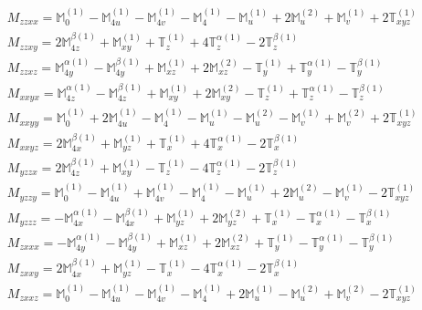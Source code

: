 \documentclass[fleqn,8pt,landscape]{jsarticle}
\begin{document}
\begin{align*}
& M_{zzxx} = \mathbb{M}_{0}^{(1)} - \mathbb{M}_{4u}^{(1)} - \mathbb{M}_{4v}^{(1)} - \mathbb{M}_{4}^{(1)} - \mathbb{M}_{u}^{(1)} + 2 \mathbb{M}_{u}^{(2)} + \mathbb{M}_{v}^{(1)} + 2 \mathbb{T}_{xyz}^{(1)} \\
& M_{zzxy} = 2 \mathbb{M}_{4z}^{\beta(1)} + \mathbb{M}_{xy}^{(1)} + \mathbb{T}_{z}^{(1)} + 4 \mathbb{T}_{z}^{\alpha(1)} - 2 \mathbb{T}_{z}^{\beta(1)} \\
& M_{zzxz} = \mathbb{M}_{4y}^{\alpha(1)} - \mathbb{M}_{4y}^{\beta(1)} + \mathbb{M}_{xz}^{(1)} + 2 \mathbb{M}_{xz}^{(2)} - \mathbb{T}_{y}^{(1)} + \mathbb{T}_{y}^{\alpha(1)} - \mathbb{T}_{y}^{\beta(1)} \\
& M_{xxyx} = \mathbb{M}_{4z}^{\alpha(1)} - \mathbb{M}_{4z}^{\beta(1)} + \mathbb{M}_{xy}^{(1)} + 2 \mathbb{M}_{xy}^{(2)} - \mathbb{T}_{z}^{(1)} + \mathbb{T}_{z}^{\alpha(1)} - \mathbb{T}_{z}^{\beta(1)} \\
& M_{xxyy} = \mathbb{M}_{0}^{(1)} + 2 \mathbb{M}_{4u}^{(1)} - \mathbb{M}_{4}^{(1)} - \mathbb{M}_{u}^{(1)} - \mathbb{M}_{u}^{(2)} - \mathbb{M}_{v}^{(1)} + \mathbb{M}_{v}^{(2)} + 2 \mathbb{T}_{xyz}^{(1)} \\
& M_{xxyz} = 2 \mathbb{M}_{4x}^{\beta(1)} + \mathbb{M}_{yz}^{(1)} + \mathbb{T}_{x}^{(1)} + 4 \mathbb{T}_{x}^{\alpha(1)} - 2 \mathbb{T}_{x}^{\beta(1)} \\
& M_{yzzx} = 2 \mathbb{M}_{4z}^{\beta(1)} + \mathbb{M}_{xy}^{(1)} - \mathbb{T}_{z}^{(1)} - 4 \mathbb{T}_{z}^{\alpha(1)} - 2 \mathbb{T}_{z}^{\beta(1)} \\
& M_{yzzy} = \mathbb{M}_{0}^{(1)} - \mathbb{M}_{4u}^{(1)} + \mathbb{M}_{4v}^{(1)} - \mathbb{M}_{4}^{(1)} - \mathbb{M}_{u}^{(1)} + 2 \mathbb{M}_{u}^{(2)} - \mathbb{M}_{v}^{(1)} - 2 \mathbb{T}_{xyz}^{(1)} \\
& M_{yzzz} = - \mathbb{M}_{4x}^{\alpha(1)} - \mathbb{M}_{4x}^{\beta(1)} + \mathbb{M}_{yz}^{(1)} + 2 \mathbb{M}_{yz}^{(2)} + \mathbb{T}_{x}^{(1)} - \mathbb{T}_{x}^{\alpha(1)} - \mathbb{T}_{x}^{\beta(1)} \\
& M_{zxxx} = - \mathbb{M}_{4y}^{\alpha(1)} - \mathbb{M}_{4y}^{\beta(1)} + \mathbb{M}_{xz}^{(1)} + 2 \mathbb{M}_{xz}^{(2)} + \mathbb{T}_{y}^{(1)} - \mathbb{T}_{y}^{\alpha(1)} - \mathbb{T}_{y}^{\beta(1)} \\
& M_{zxxy} = 2 \mathbb{M}_{4x}^{\beta(1)} + \mathbb{M}_{yz}^{(1)} - \mathbb{T}_{x}^{(1)} - 4 \mathbb{T}_{x}^{\alpha(1)} - 2 \mathbb{T}_{x}^{\beta(1)} \\
& M_{zxxz} = \mathbb{M}_{0}^{(1)} - \mathbb{M}_{4u}^{(1)} - \mathbb{M}_{4v}^{(1)} - \mathbb{M}_{4}^{(1)} + 2 \mathbb{M}_{u}^{(1)} - \mathbb{M}_{u}^{(2)} + \mathbb{M}_{v}^{(2)} - 2 \mathbb{T}_{xyz}^{(1)} \\

\end{align*}
\end{document}
